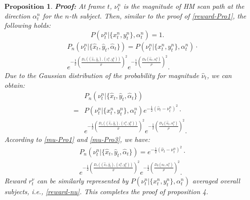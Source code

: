 \documentclass[10pt,journal,compsoc]{IEEEtran}
\newtheorem{proposition}[theorem]{$\textbf{Proposition}$}
\begin{document}
\begin{proposition}
    \textbf{Proof:} At frame $t$, $\nu^{n}_{t}$ is the magnitude of HM scan path at the direction $\alpha^{n}_{t}$ for the $n$-th subject.
    Then, similar to the proof of \eqref{reward-Pro1}, the following holds:
    \begin{equation}
        \label{mu-Pro1}
        P(\nu^{n}_{t}|\{x^{n}_{t}, y^{n}_{t}\},\alpha^{n}_{t}) = 1.
    \end{equation}
    \begin{eqnarray}
        \label{mu-Pro2}
        \nonumber && P_{n}(\nu^{n}_{t}|\{\hat{x}_{t},\hat{y}_{t}, \hat{\alpha}_{t}\}) = P(\nu^{n}_{t}|\{x^{n}_{t}, y^{n}_{t}\},\alpha^{n}_{t}) \cdot \\ && e^{-\frac{1}{2}\left(\frac{D_s((\hat{x}_{t},\hat{y}_{t}),(x^n_{t},y^n_{t}))}{\varrho}\right)^2}
        e^{-\frac{1}{2}\left(\frac{D_d(\hat{\alpha}_{t}, \alpha^n_{t})}{\rho}\right)^2}.
    \end{eqnarray}
    Due to the Gaussian distribution of the probability for magnitude $\hat{\nu}_{t}$, we can obtain:
    \begin{eqnarray}
        \label{mu-Pro3}
        \nonumber && P_{n}(\nu^{n}_{t}|\{\hat{x}_{t},\hat{y}_{t}, \hat{\alpha}_{t}\})\\
        \nonumber &=& P(\nu^{n}_{t}|\{x^{n}_{t}, y^{n}_{t}\},\alpha^{n}_{t})
        e^{-\frac{1}{2}\left({\hat{\nu}_{t}-\nu^{n}_{t}}\right)^2} \cdot \\ &&
        e^{-\frac{1}{2}\left(\frac{D_s((\hat{x}_{t},\hat{y}_{t}),(x^n_{t},y^n_{t}))}{\varrho}\right)^2}
        e^{-\frac{1}{2}\left(\frac{D_d(\hat{\alpha}_{t}, \alpha^n_{t})}{\rho}\right)^2}.
    \end{eqnarray}
    According to \eqref{mu-Pro1} and \eqref{mu-Pro3}, we have:
    \begin{eqnarray}
        \label{mu-Pro4}
        \nonumber && P_{n}(\nu^{n}_{t}|\{\hat{x}_{t},\hat{y}_{t}, \hat{\alpha}_{t}\}) =
        e^{-\frac{1}{2}\left({\hat{\nu}_{t}-\nu^{n}_{t}}\right)^2} \cdot \\ &&
        e^{-\frac{1}{2}\left(\frac{D_s((\hat{x}_{t},\hat{y}_{t}),(x^n_{t},y^n_{t}))}{\varrho}\right)^2}
        e^{-\frac{1}{2}\left(\frac{D_d(\hat{\alpha}_{t}, \alpha^n_{t})}{\rho}\right)^2}.
    \end{eqnarray}
    Reward $r^{\nu}_{t}$ can be similarly represented by
    $P(\nu^{n}_{t}|\{x^{n}_{t}, y^{n}_{t}\},\alpha^{n}_{t})$ averaged overall subjects, i.e., \eqref{reward-nu}.
    This completes the proof of proposition 4.
\end{proposition}
\end{document}
